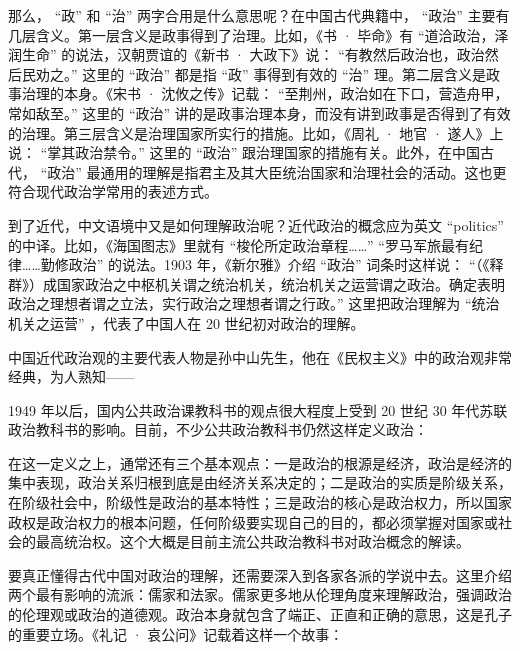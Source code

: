 那么， “政” 和 “治” 两字合用是什么意思呢？在中国古代典籍中， “政治” 主要有几层含义。第一层含义是政事得到了治理。比如，《书 · 毕命》有 “道洽政治，泽润生命” 的说法，汉朝贾谊的《新书 · 大政下》说： “有教然后政治也，政治然后民劝之。” 这里的 “政治” 都是指 “政” 事得到有效的 “治” 理。第二层含义是政事治理的本身。《宋书 · 沈攸之传》记载： “至荆州，政治如在下口，营造舟甲，常如敌至。” 这里的 “政治” 讲的是政事治理本身，而没有讲到政事是否得到了有效的治理。第三层含义是治理国家所实行的措施。比如，《周礼 · 地官 · 遂人》上说： “掌其政治禁令。” 这里的 “政治” 跟治理国家的措施有关。此外，在中国古代， “政治” 最通用的理解是指君主及其大臣统治国家和治理社会的活动。这也更符合现代政治学常用的表述方式。

到了近代，中文语境中又是如何理解政治呢？近代政治的概念应为英文 “politics” 的中译。比如，《海国图志》里就有 “梭伦所定政治章程……”  “罗马军旅最有纪律……勤修政治” 的说法。1903 年，《新尔雅》介绍 “政治” 词条时这样说： “（《释群》）成国家政治之中枢机关谓之统治机关，统治机关之运营谓之政治。确定表明政治之理想者谓之立法，实行政治之理想者谓之行政。” 这里把政治理解为 “统治机关之运营” ，代表了中国人在 20 世纪初对政治的理解。

中国近代政治观的主要代表人物是孙中山先生，他在《民权主义》中的政治观非常经典，为人熟知——


1949 年以后，国内公共政治课教科书的观点很大程度上受到 20 世纪 30 年代苏联政治教科书的影响。目前，不少公共政治教科书仍然这样定义政治：


在这一定义之上，通常还有三个基本观点：一是政治的根源是经济，政治是经济的集中表现，政治关系归根到底是由经济关系决定的；二是政治的实质是阶级关系，在阶级社会中，阶级性是政治的基本特性；三是政治的核心是政治权力，所以国家政权是政治权力的根本问题，任何阶级要实现自己的目的，都必须掌握对国家或社会的最高统治权。这个大概是目前主流公共政治教科书对政治概念的解读。


要真正懂得古代中国对政治的理解，还需要深入到各家各派的学说中去。这里介绍两个最有影响的流派：儒家和法家。儒家更多地从伦理角度来理解政治，强调政治的伦理观或政治的道德观。政治本身就包含了端正、正直和正确的意思，这是孔子的重要立场。《礼记 · 哀公问》记载着这样一个故事：

